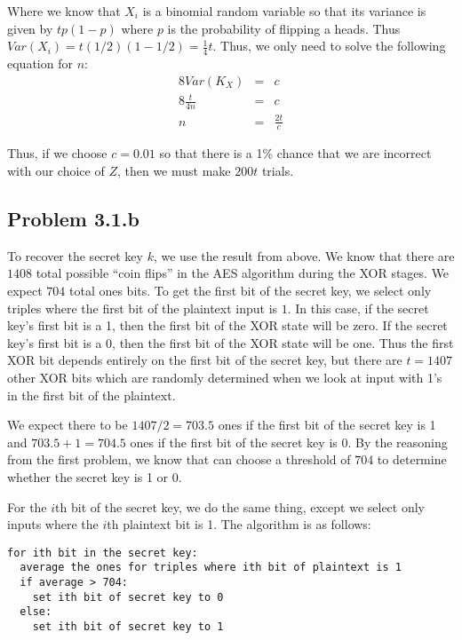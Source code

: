 \documentclass[psamsfonts]{amsart}
\begin{document}
Where we know that $X_i$ is a binomial random variable so that its variance is given by $t p (1-p)$ where $p$ is the probability of flipping a heads. Thus $Var(X_i) = t (1/2)(1 - 1/2) = \frac{1}{4} t$. Thus, we only need to solve the following equation for $n$:
\begin{eqnarray}
  8 Var(K_X) &=& c \\
  8 \frac{t}{4n} &=& c \\
               n &=& \frac{2t}{c}
\end{eqnarray}

Thus, if we choose $c = 0.01$ so that there is a 1\% chance that we are incorrect with our choice of $Z$, then we must make $200t$ trials.


\subsection{Problem 3.1.b}

To recover the secret key $k$, we use the result from above. We know that there are $1408$ total possible ``coin flips'' in the AES algorithm during the XOR stages. We expect $704$ total ones bits. To get the first bit of the secret key, we select only triples where the first bit of the plaintext input is $1$. In this case, if the secret key's first bit is a 1, then the first bit of the XOR state will be zero. If the secret key's first bit is a 0, then the first bit of the XOR state will be one. Thus the first XOR bit depends entirely on the first bit of the secret key, but there are $t = 1407$ other XOR bits which are randomly determined when we look at input with 1's in the first bit of the plaintext.

We expect there to be $1407/2 = 703.5$ ones if the first bit of the secret key is 1 and $703.5 + 1 = 704.5$ ones if the first bit of the secret key is 0. By the reasoning from the first problem, we know that can choose a threshold of $704$ to determine whether the secret key is 1 or 0.

For the $i$th bit of the secret key, we do the same thing, except we select only inputs where the $i$th plaintext bit is 1. The algorithm is as follows:

\begin{verbatim}
for ith bit in the secret key:
  average the ones for triples where ith bit of plaintext is 1
  if average > 704:
    set ith bit of secret key to 0
  else:
    set ith bit of secret key to 1
\end{verbatim}
\end{document}
